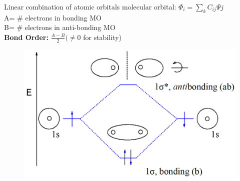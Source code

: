 \documentclass[9pt]{article}
\begin{document}
\begin{multicols}{2}

Linear combination of atomic orbitals molecular orbital: $\Phi _i= \sum_{k} C_{ij} \Psi{j}$\\
A= \# electrons in bonding MO\\
B= \# electrons in anti-bonding MO\\
\textbf{Bond Order: } $\frac{A-B}{2} (\neq 0$ for stability)\\
\begin{figure}
	\vspace{-15pt}
		\includegraphics[width=0.9\linewidth]{Images/bonding_antibonding.png}\\
	\end{figure}


\end{multicols}
\end{document}
